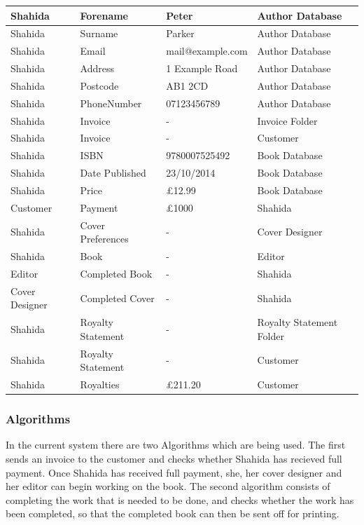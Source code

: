 \begin{center}
\begin{tabular}{|p{3.5cm}|p{3.5cm}|p{3cm}|p{3cm}|}
    Shahida & Forename & Peter & Author Database  \\ \hline
    Shahida & Surname & Parker & Author Database  \\ \hline
    Shahida & Email & mail@example.com & Author Database  \\ \hline
    Shahida & Address & 1 Example Road & Author Database  \\ \hline
    Shahida & Postcode & AB1 2CD & Author Database  \\ \hline
    Shahida & PhoneNumber & 07123456789 & Author Database  \\ \hline
    Shahida & Invoice & - & Invoice Folder \\ \hline
    Shahida & Invoice & - & Customer  \\ \hline
    Shahida & ISBN & 9780007525492 & Book Database \\ \hline
    Shahida & Date Published & 23/10/2014 & Book Database \\ \hline
    Shahida & Price & £12.99 & Book Database \\ \hline
    Customer & Payment & £1000 & Shahida  \\ \hline
    Shahida & Cover Preferences & - & Cover Designer\\ \hline
    Shahida & Book & - & Editor  \\ \hline
    Editor & Completed Book & - & Shahida  \\ \hline
    Cover Designer & Completed Cover & - & Shahida \\ \hline
    Shahida & Royalty Statement & - & Royalty Statement Folder \\ \hline
    Shahida & Royalty Statement & - & Customer \\ \hline
    Shahida & Royalties & £211.20 & Customer \\ \hline 
    \hline
\end{tabular}
\end{center}


\subsubsection{Algorithms}
In the current system there are two Algorithms which are being used. The first sends an invoice to the customer and checks whether Shahida has recieved full payment. Once Shahida has received full payment, she, her cover designer and her editor can begin working on the book. The second algorithm consists of completing the work that is needed to be done, and checks whether the work has been completed, so that the completed book can then be sent off for printing. 

